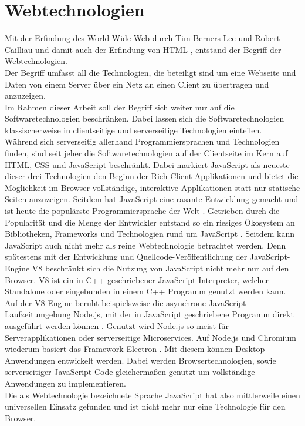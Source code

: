 \section{Webtechnologien}
\label{sec:webtechnologien}

Mit der Erfindung des World Wide Web durch Tim Berners-Lee und Robert Cailliau und damit auch der Erfindung 
von HTML \cite{www}, entstand der Begriff der Webtechnologien.\\
Der Begriff umfasst all die Technologien, die beteiligt sind um eine Webseite und Daten von einem Server über ein 
Netz an einen Client zu übertragen und anzuzeigen.\\

Im Rahmen dieser Arbeit soll der Begriff sich weiter nur auf die Softwaretechnologien beschränken. Dabei lassen
sich die Softwaretechnologien klassischerweise in clientseitige und serverseitige Technologien einteilen.\\
Während sich serverseitig allerhand Programmiersprachen und Technologien finden, sind seit jeher die Softwaretechnologien
auf der Clientseite im Kern auf HTML, CSS und JavaScript beschränkt. Dabei markiert JavaScript als neueste dieser
drei Technologien \cite{jspress} den Beginn der Rich-Client Applikationen und bietet die Möglichkeit im Browser 
vollständige, interaktive Applikationen statt nur statische Seiten anzuzeigen. Seitdem hat JavaScript eine rasante 
Entwicklung gemacht und ist heute die populärste Programmiersprache der Welt \cite{npmstat}. Getrieben durch 
die Popularität und die Menge der Entwickler entstand so ein riesiges Ökosystem an Bibliotheken, Frameworks
und Technologien rund um JavaScript \cite{npmstat}. Seitdem kann JavaScript auch nicht mehr als reine Webtechnologie
betrachtet werden.
Denn spätestens mit der Entwicklung und Quellcode-Veröffentlichung der JavaScript-Engine V8 \cite{v8} beschränkt 
sich die Nutzung von JavaScript nicht mehr nur auf den Browser. V8 ist ein in C++ geschriebener JavaScript-Interpreter, 
welcher Standalone oder eingebunden in einem C++ Programm genutzt werden kann. Auf der V8-Engine beruht beispielsweise 
die asynchrone JavaScript Laufzeitumgebung Node.js, mit der in JavaScript geschriebene Programm direkt ausgeführt 
werden können \cite{node}. Genutzt wird Node.js so meist für Serverapplikationen oder serverseitige Microservices.
Auf Node.js und Chromium wiederum basiert das Framework Electron \cite{electron}. Mit diesem können Desktop-Anwendungen
entwickelt werden. Dabei werden Browsertechnologien, sowie serverseitiger JavaScript-Code gleichermaßen
genutzt um vollständige Anwendungen zu implementieren.\\
Die als Webtechnologie bezeichnete Sprache JavaScript hat also mittlerweile einen universellen Einsatz gefunden 
und ist nicht mehr nur eine Technologie für den Browser.\\

